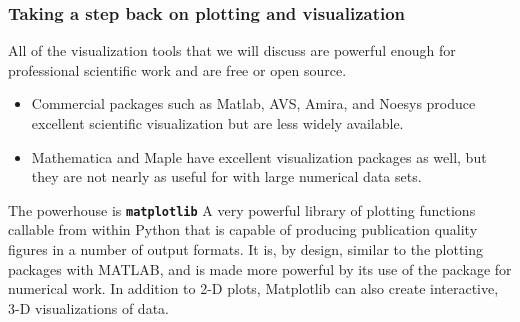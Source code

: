 \documentclass[hyperref={colorlinks=true}]{beamer}
\begin{document}
\begin{frame}%
  \frametitle{Taking a step back on plotting and visualization}
  
  All of the visualization tools that we will discuss are powerful enough for professional scientific work and are free or open source. 
  \begin{itemize}
    \item Commercial packages such as Matlab, AVS, Amira, and Noesys produce excellent scientific visualization but are less widely available. 
    \item Mathematica and Maple have excellent visualization packages as well, but they are not nearly as useful for with large numerical data sets.
  \end{itemize}  
  
  
  \begin{ucblock}{The powerhouse is \textbf{\texttt{matplotlib}}} 
    A very powerful library of plotting functions callable from within Python that is capable of producing publication quality figures in a number of output formats. It is, by design, similar to the plotting packages with MATLAB, and is made more powerful by its use of the  package for numerical work. In addition to 2-D plots, Matplotlib can also create interactive, 3-D visualizations of data.
  \end{ucblock}

\end{frame}

\end{document}
